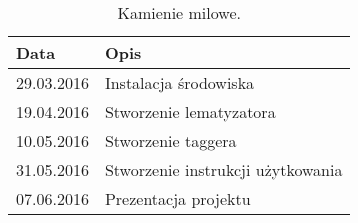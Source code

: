 \documentclass[a4paper, 11pt]{article}
\begin{document}
		\begin{table}[H]
		\centering
		\caption{Kamienie milowe.}
		\smallskip
		\begin{tabular}{p{4cm}p{8cm}}
			\textbf{Data}& \textbf{Opis} \\\hline
			29.03.2016 & Instalacja środowiska \\\hline
			19.04.2016 & Stworzenie lematyzatora \\\hline
			10.05.2016 & Stworzenie taggera \\\hline
			31.05.2016 & Stworzenie instrukcji użytkowania \\\hline
			07.06.2016 & Prezentacja projektu \\\hline		
		\end{tabular}
	\end{table}
	
\end{document}
